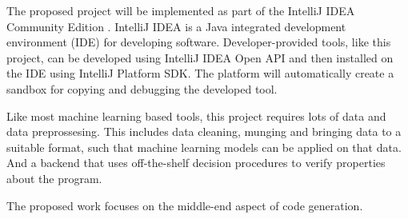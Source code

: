 The proposed project will be implemented as part of the IntelliJ IDEA Community
Edition \cite{jet2017intellij}. IntelliJ IDEA is a Java integrated
development environment (IDE) for developing software. Developer-provided tools,
like this project, can be developed using IntelliJ IDEA Open API and then
installed on the IDE using IntelliJ Platform SDK. The platform will
automatically create a sandbox for copying and debugging the developed tool.

Like most machine learning based tools, this project requires lots of data and
data preprossesing. This includes data cleaning, munging and bringing data
to a suitable format, such that machine learning models can be applied on
that data. And a backend that uses off-the-shelf decision procedures to verify
properties about the program.

The proposed work focuses on the middle-end aspect of code generation.



